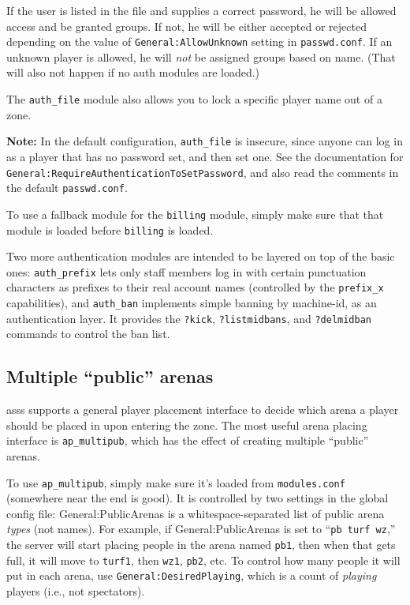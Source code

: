 \documentclass{article}
\newcommand{\asss}{asss}
\begin{document}
If the user is listed in the file and supplies a correct password, he
will be allowed access and be granted groups. If not, he will be either
accepted or rejected depending on the value of
\verb/General:AllowUnknown/ setting in \verb/passwd.conf/. If an unknown
player is allowed, he will \emph{not} be assigned groups based on name.
(That will also not happen if no auth modules are loaded.)

The \verb/auth_file/ module also allows you to lock a specific player
name out of a zone.

\textbf{Note:} In the default configuration, \verb/auth_file/ is
insecure, since anyone can log in as a player that has no password set,
and then set one. See the documentation for
\verb/General:RequireAuthenticationToSetPassword/, and also read the
comments in the default \verb/passwd.conf/.

To use a fallback module for the \verb/billing/ module, simply make sure
that that module is loaded before \verb/billing/ is loaded.

Two more authentication modules are intended to be layered on top of the
basic ones: \verb/auth_prefix/ lets only staff members log in with
certain punctuation characters as prefixes to their real account names
(controlled by the \verb/prefix_x/ capabilities), and \verb/auth_ban/
implements simple banning by machine-id, as an authentication layer. It
provides the \verb/?kick/, \verb/?listmidbans/, and \verb/?delmidban/
commands to control the ban list.


\subsection{Multiple ``public'' arenas}

\asss{} supports a general player placement interface to decide which
arena a player should be placed in upon entering the zone. The most
useful arena placing interface is \verb/ap_multipub/, which has the
effect of creating multiple ``public'' arenas.

To use \verb/ap_multipub/, simply make sure it's loaded from
\verb/modules.conf/ (somewhere near the end is good). It is controlled
by two settings in the global config file: General:PublicArenas is a
whitespace-separated list of public arena \emph{types} (not names). For
example, if General:PublicArenas is set to ``\verb/pb turf wz/,'' the
server will start placing people in the arena named \verb/pb1/, then
when that gets full, it will move to \verb/turf1/, then \verb/wz1/,
\verb/pb2/, etc. To control how many people it will put in each arena,
use \verb/General:DesiredPlaying/, which is a count of \emph{playing}
players (i.e., not spectators).
\end{document}
